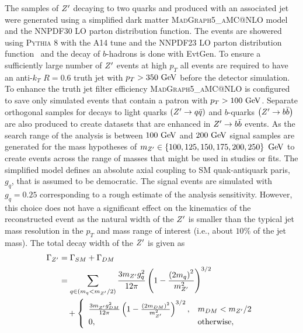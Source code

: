 The samples of $Z^{\prime}$ decaying to two quarks and produced with an associated jet were generated using a simplified dark matter \textsc{MadGraph5_aMC@NLO} model~\cite{Abercrombie:2015wmb} and the NNPDF30 LO parton distribution function.
The events are showered using \textsc{Pythia 8} with the A14 tune and the NNPDF23 LO parton distribution function~\cite{Carrazza:2013axa} and the decay of $b$-hadrons is done with EvtGen.
To ensure a sufficiently large number of $Z^{\prime}$ events at high $p_{T}$ all events are required to have an anti-$k_{T}$ $R = 0.6$ truth jet with $p_{T} > 350~\mathrm{GeV}$ before the detector simulation.
To enhance the truth jet filter efficiency \textsc{MadGraph5_aMC@NLO} is configured to save only simulated events that contain a patron with $p_{T} > 100~\mathrm{GeV}$.
Separate orthogonal samples for decays to light quarks $\left(Z^{\prime} \to q\bar{q}\right)$ and $b$-quarks $\left(Z^{\prime} \to b\bar{b}\right)$ are also produced to create datasets that are enhanced in $Z^{\prime} \to b\bar{b}$ events.
As the search range of the analysis is between $100~\mathrm{GeV}$ and $200~\mathrm{GeV}$ signal samples are generated for the mass hypotheses of $m_{Z^{\prime}} \in \left\{100, 125, 150, 175, 200, 250\right\}~\mathrm{GeV}$ to create events across the range of masses that might be used in studies or fits.
The simplified model defines an absolute axial coupling to SM quak-antiquark paris, $g_{q}$, that is assumed to be democratic.
The signal events are simulated with $g_{q} = 0.25$ corresponding to a rough estimate of the analysis sensitivity.
However, this choice does not have a significant effect on the kinematics of the reconstructed event as the natural width of the $Z^{\prime}$ is smaller than the typical \largeR{} jet mass resolution in the $p_{T}$ and mass range of interest (i.e., about $10\%$ of the jet mass).
The total decay width of the $Z^{\prime}$ is given as
\[
 \begin{split}
  \Gamma_{Z^{\prime}} &= \Gamma_{SM} + \Gamma_{DM} \\
  &= \sum_{q \in \left(m_{q} < m_{Z^{\prime}}/2\right)} \frac{3 m_{Z^{\prime}} g_{q}^{2}}{12 \pi} \left(1 - \frac{\left(2m_{q}\right)^{2}}{m_{Z^{\prime}}^{2}}\right)^{3/2} \\
  &\quad + \left\{\begin{array}{ll}
   \frac{3 m_{Z^{\prime}} g_{DM}^{2}}{12 \pi} \left(1 - \frac{\left(2m_{DM}\right)^{2}}{m_{Z^{\prime}}^{2}}\right)^{3/2}, & m_{DM} < m_{Z^{\prime}}/2 \\
   0,                                                                                                               & \mathrm{otherwise},
  \end{array}\right.
 \end{split}
\]
